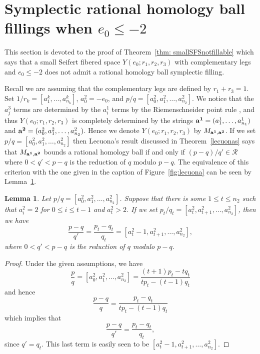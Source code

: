 \documentclass[11pt]{amsart}
\theoremstyle{plain}
\newtheorem{lemma}[theorem]{Lemma}
\theoremstyle{definition}
\theoremstyle{remark}
\numberwithin{theorem}{section}
\begin{document}
\section{Symplectic rational homology ball fillings when $e_0 \leq -2$}\label{m2case}
This section is devoted to the proof of Theorem~\ref{thm: smallSFSnotfillable} which says that a small Seifert fibered space $Y(e_0; r_1, r_2, r_3)$ with complementary legs and $e_0\leq -2$ does not admit a rational homology ball symplectic filling. 

Recall we are assuming that the complementary legs are defined by  $r_1+r_3=1$.  Set $1/r_k=[a_1^k,\ldots, a_{n_k}^k]$, $a^2_0=-e_0$, and $p/q=[a^2_0,a^2_1,\ldots, a^2_{n_2}]$. We notice that the $a_j^3$ terms are determined by the $a_i^1$ terms by the Riemenschneider point rule \cite{Riemenschneider1974}, and thus  $Y(e_0; r_1, r_2, r_3)$ is completely determined by the strings ${\bf a^1}=(a_1^1,\ldots, a_{n_1}^1)$ and ${\bf{a^2}}=(a_0^2, a_1^2,\ldots, a_{n_2}^2)$. Hence  we denote $Y(e_0; r_1, r_2, r_3)$ by $M_{{\bf a^1}, {\bf a^2}}$. If we set $p/q=[a_0^2, a_1^2,\ldots, a_{n_2}^2]$ then Lecuona's result discussed in Theorem~\ref{lecuonas} says that $M_{{\bf a^1}, {\bf a^2}}$ bounds a rational homology ball if and only if $(p-q)/q'\in \mathcal{R}$ where $0<q'<p-q$ is the reduction of $q$ modulo $p-q$. The equivalence of this criterion with the one given in the caption of Figure~\ref{fig:lecuona} can be seen by Lemma~\ref{lem: equiv}. 

\begin{lemma}\label{lem: equiv} Let $p/q=[a_0^2, a_1^2,\ldots, a_{n_2}^2]$. Suppose that  there is some  $ 1 \leq t \leq n_2$ such that $a^2_i =2$ 
for $ 0 \leq i \leq t-1$ and $a^2_t > 2$.  If we set 
$p_t/q_t=[a_t^2, a_{t+1}^2,\ldots, a_{n_2}^2]$, then we have 
\[
\frac{p-q}{q'}= \frac{p_t-q_t}{q_t}= [a_t^2-1, a_{t+1}^2,\ldots, a_{n_2}^2],
\] 
where $0<q'<p-q$ is the reduction of $q$ modulo $p-q$.  
\end{lemma} 

\begin{proof} Under the given assumptions, we have 
\[
\frac{p}{q}=[a_0^2, a_1^2,\ldots, a_{n_2}^2]=\frac{(t+1)p_t -tq_t}{tp_t - (t-1)q_t}
\] 
and hence 
\[
\frac{p-q}{q}=\frac{p_t-q_t}{{tp_t - (t-1)q_t}}
\]
which implies that
\[
\frac{p-q}{q'}=\frac{p_t-q_t}{q_t},
\]
since $q'=q_t$. This last term is easily seen to be $[a_t^2-1, a_{t+1}^2,\ldots, a_{n_2}^2]$.
\end{proof}
\end{document}
